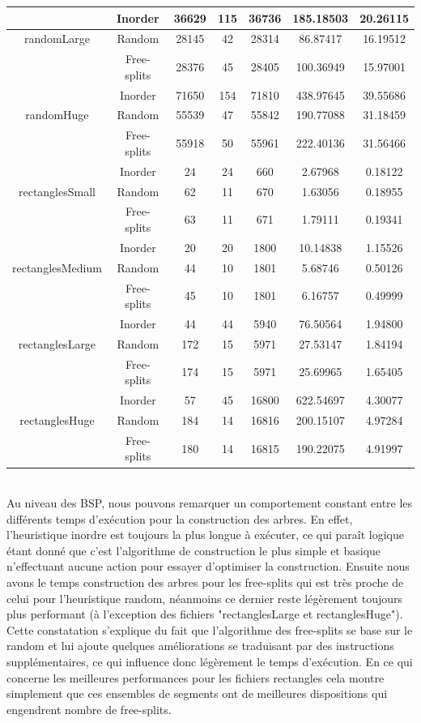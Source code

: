 \documentclass[11pt,a4paper]{article}
\theoremstyle{definition}
\theoremstyle{remark}
\begin{document}
\begin{table}[H]
{\begin{tabular}{|c|c||c|c|c|c|c|}
\hline  
  & Inorder & 36629 & 115 & 36736 & 185.18503 & 20.26115 \\ 
\hline 
randomLarge & Random & 28145 & 42 & 28314 & 86.87417 & 16.19512 \\ 
\hline 
  & Free-splits & 28376 & 45 & 28405 & 100.36949 & 15.97001 \\ 
\hline
  & Inorder & 71650 & 154 & 71810 & 438.97645 & 39.55686 \\ 
\hline 
randomHuge & Random & 55539 & 47 & 55842 & 190.77088 & 31.18459 \\ 
\hline 
  & Free-splits & 55918 & 50 & 55961 & 222.40136 & 31.56466 \\ 
\hline
  & Inorder & 24 & 24 & 660 & 2.67968 & 0.18122 \\ 
\hline 
rectanglesSmall & Random & 62 & 11 & 670 & 1.63056 & 0.18955 \\ 
\hline 
  & Free-splits & 63 & 11 & 671 & 1.79111 & 0.19341 \\ 
\hline
  & Inorder & 20 & 20 & 1800 & 10.14838 & 1.15526 \\ 
\hline 
rectanglesMedium & Random & 44 & 10 & 1801 & 5.68746 & 0.50126 \\ 
\hline 
  & Free-splits & 45 & 10 & 1801 & 6.16757 & 0.49999 \\ 
\hline  
  & Inorder & 44 & 44 & 5940 & 76.50564 & 1.94800 \\ 
\hline 
rectanglesLarge & Random & 172 & 15 & 5971 & 27.53147 & 1.84194 \\ 
\hline 
  & Free-splits & 174 & 15 & 5971 & 25.69965 & 1.65405 \\ 
\hline
  & Inorder & 57 & 45 & 16800 & 622.54697 & 4.30077 \\ 
\hline 
rectanglesHuge & Random & 184 & 14 & 16816 & 200.15107 & 4.97284 \\ 
\hline 
  & Free-splits & 180 & 14 & 16815 & 190.22075 & 4.91997 \\ 
\hline
\end{tabular}%
}
\end{table}
\\
Au niveau des BSP, nous pouvons remarquer un comportement constant entre les différents temps d'exécution pour la construction des arbres. En effet, l'heuristique inordre est toujours la plus longue à exécuter, ce qui paraît logique étant donné que c'est l'algorithme de construction le plus simple et basique n'effectuant aucune action pour essayer d'optimiser la construction. 
Ensuite nous avons le temps construction des arbres pour les free-splits qui est très proche de celui pour l'heuristique random, néanmoins ce dernier reste légèrement toujours plus performant (à l'exception des fichiers "rectanglesLarge et rectanglesHuge"). Cette constatation s'explique du fait que l'algorithme des free-splits se base sur le random et lui ajoute quelques améliorations se traduisant par des instructions supplémentaires, ce qui influence donc légèrement le temps d'exécution. En ce qui concerne les meilleures performances pour les fichiers rectangles cela montre simplement que ces ensembles de segments ont de meilleures dispositions qui engendrent nombre de free-splits.\\
\end{document}
